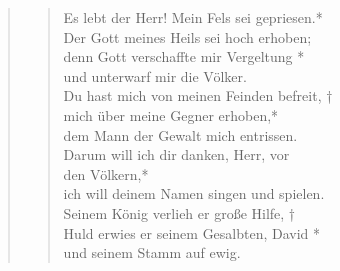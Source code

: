
\begin{quote}
\begin{verse}








\smallskip


Es lebt der Herr! Mein Fels sei gepriesen.*\\
Der Gott meines Heils sei hoch erhoben;\\ \vin
denn Gott verschaffte mir Vergeltung *\\ \vin
und unterwarf mir die Völker.\\
Du hast mich von meinen Feinden befreit, †\\
mich über meine Gegner erhoben,*\\
dem Mann der Gewalt mich entrissen.\\ \vin
Darum will ich dir danken, Herr, vor \\ \vin den Völkern,*\\ \vin
ich will deinem Namen singen und spielen.\\
Seinem König verlieh er große Hilfe, †\\
Huld erwies er seinem Gesalbten, David *\\
und seinem Stamm auf ewig.\\
\end{verse}

\begin{verse}



\end{verse}
\end{quote}
